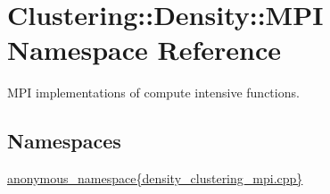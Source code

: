 \hypertarget{namespaceClustering_1_1Density_1_1MPI}{\section{Clustering\-:\-:Density\-:\-:M\-P\-I Namespace Reference}
\label{namespaceClustering_1_1Density_1_1MPI}
}


M\-P\-I implementations of compute intensive functions.  


\subsection*{Namespaces}
\begin{DoxyCompactItemize}
\item 
\hyperlink{namespaceClustering_1_1Density_1_1MPI_1_1anonymous__namespace_02density__clustering__mpi_8cpp_03}{anonymous\-\_\-namespace\{density\-\_\-clustering\-\_\-mpi.\-cpp\}}
\end{DoxyCompactItemize}
